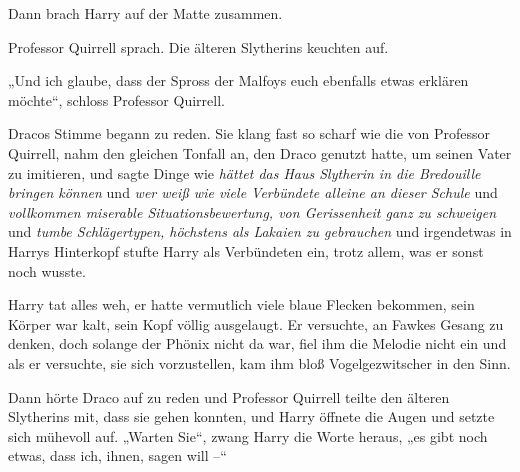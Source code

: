 Dann brach Harry auf der Matte zusammen.

Professor Quirrell sprach. Die älteren Slytherins keuchten auf.

„Und ich glaube, dass der Spross der Malfoys euch ebenfalls etwas erklären möchte“, schloss Professor Quirrell.

Dracos Stimme begann zu reden. Sie klang fast so scharf wie die von Professor Quirrell, nahm den gleichen Tonfall an, den Draco genutzt hatte, um seinen Vater zu imitieren, und sagte Dinge wie \emph{hättet das Haus Slytherin in die Bredouille bringen können} und \emph{wer weiß wie viele Verbündete alleine an dieser Schule} und \emph{vollkommen miserable Situationsbewertung, von Gerissenheit ganz zu schweigen} und \emph{tumbe Schlägertypen, höchstens als Lakaien zu gebrauchen} und irgendetwas in Harrys Hinterkopf stufte Harry als Verbündeten ein, trotz allem, was er sonst noch wusste.

Harry tat alles weh, er hatte vermutlich viele blaue Flecken bekommen, sein Körper war kalt, sein Kopf völlig ausgelaugt. Er versuchte, an Fawkes Gesang zu denken, doch solange der Phönix nicht da war, fiel ihm die Melodie nicht ein und als er versuchte, sie sich vorzustellen, kam ihm bloß Vogelgezwitscher in den Sinn.

Dann hörte Draco auf zu reden und Professor Quirrell teilte den älteren Slytherins mit, dass sie gehen konnten, und Harry öffnete die Augen und setzte sich mühevoll auf. „Warten Sie“, zwang Harry die Worte heraus, „es gibt noch etwas, dass ich, ihnen, sagen will –“

